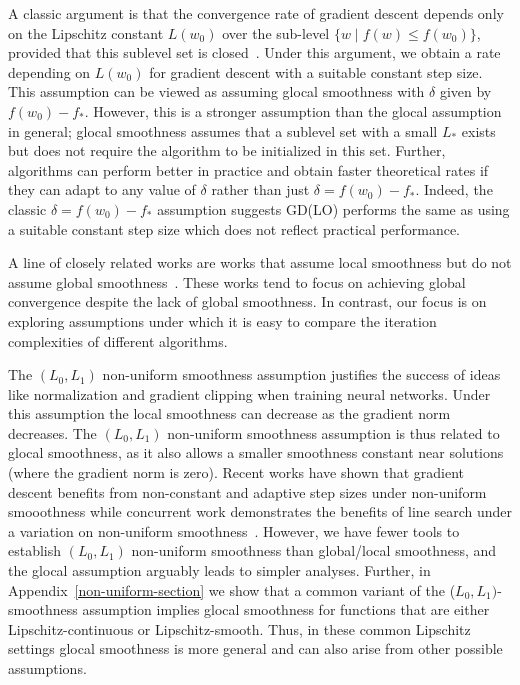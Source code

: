 \documentclass[10pt]{article} %
\begin{document}
A classic argument is that the convergence rate of gradient descent depends only on the Lipschitz constant $L(w_0)$ over the sub-level $\{w \; | \; f(w) \leq f(w_0)\}$, provided that this sublevel set is closed~\cite[Chapter 9]{boyd2004}. Under this argument, we obtain a  rate depending on $L(w_0)$ for gradient descent with a suitable constant step size. This assumption can be viewed as assuming glocal smoothness with $\delta$ given by $f(w_0)-f_*$. However, this is a stronger assumption than the glocal assumption in general; glocal smoothness assumes that a sublevel set with a small $L_*$ exists but does not require the algorithm to be initialized in this set. Further, algorithms can perform better in practice and obtain faster theoretical rates if they can adapt to any value of $\delta$ rather than just $\delta=f(w_0)-f_*$. Indeed, the classic $\delta=f(w_0)-f_*$ assumption suggests GD(LO) performs the same as using a suitable constant step size which does not reflect practical performance.

A line of closely related works are works that assume local smoothness but do not assume global smoothness~\cite{ParkSW21,patel2022,LuM23,zhang2024first, MalitskyM20}. These works tend to focus on achieving global convergence despite the lack of global smoothness. In contrast, our focus is on exploring assumptions under which it is easy to compare the iteration complexities of different algorithms.

The $(L_0,L_1)$ non-uniform smoothness assumption \cite{zhang2019gradient} justifies the success of ideas like normalization and gradient clipping when training neural networks. Under this assumption the local smoothness can decrease as the gradient norm decreases. The $(L_0,L_1)$ non-uniform smoothness assumption is thus related to glocal smoothness, as it also allows a smaller smoothness constant near solutions (where the gradient norm is zero). Recent works have shown that gradient descent benefits from non-constant and adaptive step sizes under non-uniform smooothness \cite{gorbunov2024methods} while concurrent work demonstrates the benefits of line search under a variation on non-uniform smoothness~\cite{vaswani2025armijo}. However, we have fewer tools to establish $(L_0,L_1)$ non-uniform smoothness than global/local smoothness, and the glocal assumption arguably leads to simpler analyses. Further, in Appendix~\ref{non-uniform-section} we show that a common variant of the ($L_0,L_1)$-smoothness assumption implies glocal smoothness for functions that are either Lipschitz-continuous or Lipschitz-smooth. Thus, in these common Lipschitz settings glocal smoothness is more general and can also arise from other possible assumptions.
\end{document}
